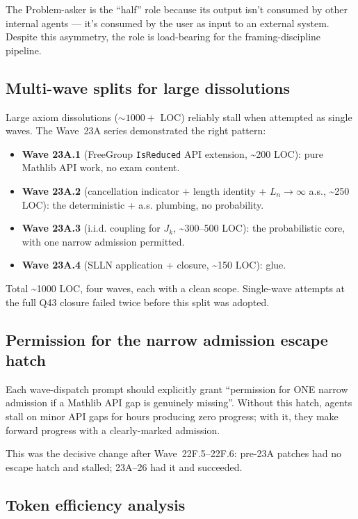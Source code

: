 \documentclass[11pt,a4paper]{article}
\theoremstyle{plain}
\theoremstyle{definition}
\begin{document}
The Problem-asker is the ``half'' role because its output isn't
consumed by other internal agents --- it's consumed by the user as
input to an external system. Despite this asymmetry, the role is
load-bearing for the framing-discipline pipeline.

\subsection{Multi-wave splits for large dissolutions}

Large axiom dissolutions ($\sim 1000+$ LOC) reliably stall when
attempted as single waves. The Wave~23A series demonstrated the
right pattern:

\begin{itemize}[leftmargin=1.5em]
\item \textbf{Wave 23A.1} (FreeGroup \verb|IsReduced| API extension,
      \textasciitilde 200 LOC): pure Mathlib API work, no exam content.
\item \textbf{Wave 23A.2} (cancellation indicator + length identity
      + $L_n \to \infty$ a.s., \textasciitilde 250 LOC): the
      deterministic + a.s. plumbing, no probability.
\item \textbf{Wave 23A.3} (i.i.d. coupling for $J_k$,
      \textasciitilde 300--500 LOC): the probabilistic core, with
      one narrow admission permitted.
\item \textbf{Wave 23A.4} (SLLN application + closure,
      \textasciitilde 150 LOC): glue.
\end{itemize}

Total \textasciitilde 1000 LOC, four waves, each with a clean scope.
Single-wave attempts at the full Q43 closure failed twice before this
split was adopted.

\subsection{Permission for the narrow admission escape hatch}

Each wave-dispatch prompt should explicitly grant ``permission for
ONE narrow admission if a Mathlib API gap is genuinely missing''.
Without this hatch, agents stall on minor API gaps for hours
producing zero progress; with it, they make forward progress with a
clearly-marked admission.

This was the decisive change after Wave~22F.5--22F.6: pre-23A
patches had no escape hatch and stalled; 23A--26 had it and succeeded.

\subsection{Token efficiency analysis}
\end{document}
